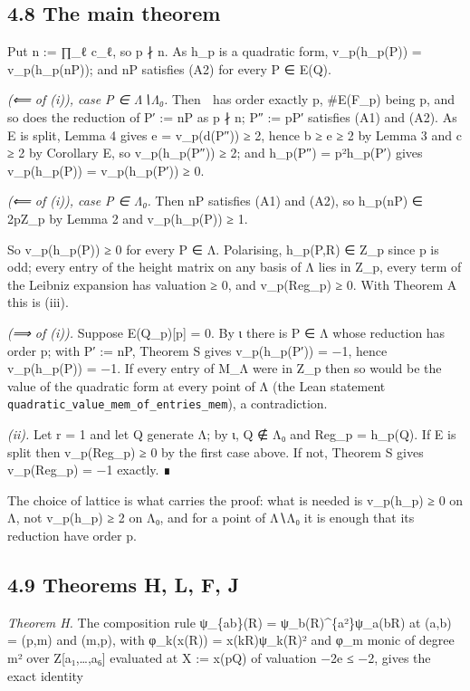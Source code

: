 \documentclass[11pt,a4paper]{article}
\theoremstyle{named}
\begin{document}
\subsection*{4.8 The main theorem}

Put n := ∏\_ℓ c\_ℓ, so p ∤ n. As h\_p is a quadratic form, v\_p(h\_p(P)) = v\_p(h\_p(nP)); and nP satisfies (A2) for every P ∈ E(Q).

\textit{(⟸ of (i)), case P ∈ Λ∖Λ₀.} Then  has order exactly p, \#E(F\_p) being p, and so does the reduction of P′ := nP as p ∤ n; P″ := pP′ satisfies (A1) and (A2). As E is split, Lemma 4 gives e = v\_p(d(P″)) ≥ 2, hence b ≥ e ≥ 2 by Lemma 3 and c ≥ 2 by Corollary E, so v\_p(h\_p(P″)) ≥ 2; and h\_p(P″) = p²h\_p(P′) gives v\_p(h\_p(P)) = v\_p(h\_p(P′)) ≥ 0.

\textit{(⟸ of (i)), case P ∈ Λ₀.} Then nP satisfies (A1) and (A2), so h\_p(nP) ∈ 2pZ\_p by Lemma 2 and v\_p(h\_p(P)) ≥ 1.

So v\_p(h\_p(P)) ≥ 0 for every P ∈ Λ. Polarising, h\_p(P,R) ∈ Z\_p since p is odd; every entry of the height matrix on any basis of Λ lies in Z\_p, every term of the Leibniz expansion has valuation ≥ 0, and v\_p(Reg\_p) ≥ 0. With Theorem A this is (iii).

\textit{(⟹ of (i)).} Suppose E(Q\_p)[p] = 0. By ι there is P ∈ Λ whose reduction has order p; with P′ := nP, Theorem S gives v\_p(h\_p(P′)) = −1, hence v\_p(h\_p(P)) = −1. If every entry of M\_Λ were in Z\_p then so would be the value of the quadratic form at every point of Λ (the Lean statement \texttt{quadratic\_\allowbreak{}value\_\allowbreak{}mem\_\allowbreak{}of\_\allowbreak{}entries\_\allowbreak{}mem}), a contradiction.

\textit{(ii).} Let r = 1 and let Q generate Λ; by ι, Q ∉ Λ₀ and Reg\_p = h\_p(Q). If E is split then v\_p(Reg\_p) ≥ 0 by the first case above. If not, Theorem S gives v\_p(Reg\_p) = −1 exactly. ∎

The choice of lattice is what carries the proof: what is needed is v\_p(h\_p) ≥ 0 on Λ, not v\_p(h\_p) ≥ 2 on Λ₀, and for a point of Λ∖Λ₀ it is enough that its reduction have order p.

\subsection*{4.9 Theorems H, L, F, J}

\textit{Theorem H.} The composition rule ψ\_\{ab\}(R) = ψ\_b(R)\textasciicircum{}\{a²\}ψ\_a(bR) at (a,b) = (p,m) and (m,p), with φ\_k(x(R)) = x(kR)ψ\_k(R)² and φ\_m monic of degree m² over Z[a₁,…,a₆] evaluated at X := x(pQ) of valuation −2e ≤ −2, gives the exact identity
\end{document}

